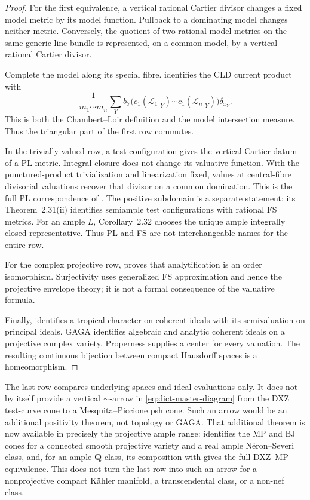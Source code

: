 \begin{proof}
For the first equivalence, a vertical rational Cartier divisor changes a
fixed model metric by its model function.
Pullback to a dominating model changes neither metric.
Conversely, the quotient of two rational model metrics on the same generic
line bundle is represented, on a common model, by a vertical rational
Cartier divisor.

Complete the model along its special fibre.
 identifies the CLD current product with
\[
 \frac{1}{m_1\cdots m_n}
 \sum_Y b_Y
   \bigl(c_1(\mathcal L_1|_Y)\cdots
         c_1(\mathcal L_n|_Y)\bigr)\delta_{x_Y}.
\tag{63.5}\label{eq:dict-model-measure}
\]
This is both the Chambert--Loir definition and the model intersection
measure.
Thus the triangular part of the first row commutes.

In the trivially valued row, a test configuration gives the vertical
Cartier datum of a PL metric.
Integral closure does not change its valuative function.
With the punctured-product trivialization and linearization fixed, values at
central-fibre divisorial valuations recover that divisor on a common
domination.
This is the full PL correspondence of
\cite[Theorem~2.31(i), pp.~685--686]{BJ22}.
The positive subdomain is a separate statement: its Theorem~2.31(ii)
identifies semiample test configurations with rational FS metrics.
For an ample $L$, Corollary~2.32 chooses the unique ample integrally
closed representative. Thus PL and FS are not interchangeable names
for the entire row.

For the complex projective row,  proves that
analytification is an order isomorphism.
Surjectivity uses generalized FS approximation and hence the projective
envelope theory; it is not a formal consequence of the valuative formula.

Finally,  identifies a tropical
character on coherent ideals with its semivaluation on principal ideals.
GAGA identifies algebraic and analytic coherent ideals on a projective
complex variety.
Properness supplies a center for every valuation.
The resulting continuous bijection between compact Hausdorff spaces is a
homeomorphism.
\end{proof}

\begin{remark}
\label{rem:dict-space-not-psh}
The last row compares underlying spaces and ideal evaluations only.
It does not by itself provide a vertical $\sim$-arrow in
\eqref{eq:dict-master-diagram} from the DXZ test-curve cone to a
Mesquita--Piccione psh cone.
Such an arrow would be an additional positivity theorem, not topology or
GAGA.
That additional theorem is now available in precisely the projective ample
range:  identifies the MP and BJ
cones for a connected smooth projective variety and a real ample
N\'eron--Severi class, and, for an ample $\mathbf Q$-class, its
composition with  gives the full DXZ--MP equivalence.
This does not turn the last row into such an arrow for a nonprojective
compact K\"ahler manifold, a transcendental class, or a non-nef class.
\end{remark}

